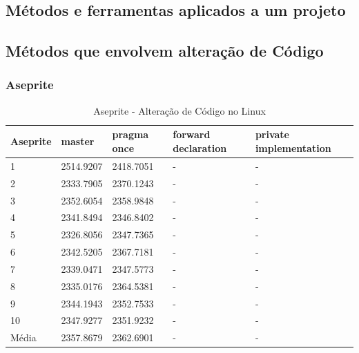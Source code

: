 \begin{apendicesenv}
\clearpage
\section{Métodos e ferramentas aplicados a um projeto}
\label{metodos_ferramenas_aplicado_a_um_projeto}

\subsection{Métodos que envolvem alteração de Código}
\label{metodos_codigo_apendice}

\subsubsection*{Aseprite}

\begin{table}[!h]
\tiny
\centering
\caption{Aseprite - Alteração de Código no Linux }
\label{tab:alteracao_de_codigo:linux:aseprite}
\begin{tabular}{lllll}
\textbf{Aseprite} & \textbf{master} & \textbf{pragma once} & \textbf{forward declaration} & \textbf{private implementation}   \\ \toprule
1                      &    2514.9207         &  2418.7051   &  -   &  -   \\ 
2                      &    2333.7905         &  2370.1243   &  -   &  -   \\ 
3                      &    2352.6054         &  2358.9848   &  -   &  -   \\ 
4                      &    2341.8494         &  2346.8402   &  -   &  -   \\ 
5                      &    2326.8056         &  2347.7365   &  -   &  -   \\ 
6                      &    2342.5205         &  2367.7181   &  -   &  -   \\ 
7                      &    2339.0471         &  2347.5773   &  -   &  -   \\ 
8                      &    2335.0176         &  2364.5381   &  -   &  -   \\ 
9                      &    2344.1943         &  2352.7533   &  -   &  -   \\ 
10                     &    2347.9277         &  2351.9232   &  -   &  -   \\ \bottomrule
Média                  &    2357.8679         &  2362.6901   &  -   &  -   \\ 
\end{tabular}
\end{table}


\end{apendicesenv}
